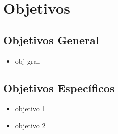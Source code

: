 \section{Objetivos}
\subsection{Objetivos General}
\begin{itemize}
\item obj gral. 

\end{itemize}

\subsection{Objetivos Específicos}
\begin{itemize}
\item objetivo 1
\item objetivo 2  

\end{itemize} 
\newpage